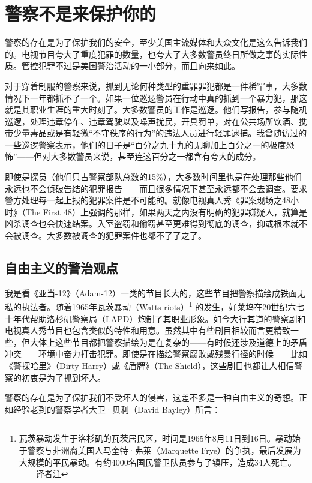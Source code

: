 \documentclass[fontset=fandol, a4paper, 12pt, openright]{ctexbook}
\begin{document}
\chapter{警察不是来保护你的}

警察的存在是为了保护我们的安全，至少美国主流媒体和大众文化是这么告诉我们的。电视节目夸大了重度犯罪的数量，也夸大了大多数警员终日所做之事的实际性质。管控犯罪不过是美国警治活动的一小部分，而且向来如此。

对于穿着制服的警察来说，抓到无论何种类型的重罪罪犯都是一件稀罕事，大多数情况下一年都抓不了一个。如果一位巡逻警员在行动中真的抓到一个暴力犯，那这就是其职业生涯的重大时刻了。大多数警员的工作是巡逻。他们写报告，参与随机巡逻，处理违章停车、违章驾驶以及噪声扰民，开具罚单，对在公共场所饮酒、携带少量毒品或是有轻微“不守秩序的行为”的违法人员进行轻罪逮捕。我曾随访过的一些巡逻警察表示，他们的日子是“百分之九十九的无聊加上百分之一的极度恐怖”——但对大多数警员来说，甚至连这百分之一都含有夸大的成分。

即使是探员（他们只占警察部队总数的15\%），大多数时间里也是在处理那些他们永远也不会侦破告结的犯罪报告——而且很多情况下甚至永远都不会去调查。要求警方处理每一起上报的犯罪案件是不可能的。就像电视真人秀《罪案现场之48小时》（The First 48）上强调的那样，如果两天之内没有明确的犯罪嫌疑人，就算是凶杀调查也会快速结案。入室盗窃和偷窃甚至更难得到彻底的调查，抑或根本就不会被调查。大多数被调查的犯罪案件也都不了了之了。

\section{自由主义的警治观点}

我是看《亚当-12》（Adam-12）一类的节目长大的，这些节目把警察描绘成铁面无私的执法者。随着1965年瓦茨暴动（Watts riots）\footnote{瓦茨暴动发生于洛杉矶的瓦茨居民区，时间是1965年8月11日到16日。暴动始于警察与非洲裔美国人马奎特·弗莱（Marquette Frye）的争执，最后发展为大规模的平民暴动。有约4000名国民警卫队员参与了镇压，造成34人死亡。——译者注} 的发生，好莱坞在20世纪六七十年代帮助洛杉矶警察局（LAPD）炮制了其职业形象。如今大行其道的警察剧和电视真人秀节目也包含类似的特性和用意。虽然其中有些剧目相较而言更精致一些，但大体上这些节目都把警察描绘为是在复杂的——有时候还涉及道德上的矛盾冲突——环境中奋力打击犯罪。即使是在描绘警察腐败或残暴行径的时候——比如《警探哈里》（Dirty Harry）或《盾牌》（The Shield），这些剧目也都让人相信警察的初衷是为了抓到坏人。

警察的存在是为了保护我们不受坏人的侵害，这差不多是一种自由主义的奇想。正如经验老到的警察学者大卫·贝利（David Bayley）所言：
\end{document}
